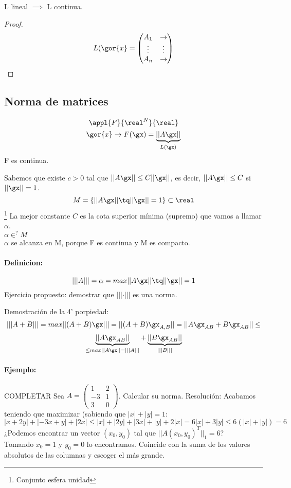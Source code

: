 \documentclass[a4paper,10pt]{apuntes}
\newcommand{\definition}[1]{\paragraph{Definicion: #1\\}}
\begin{document}
\begin{theorem}
 L lineal $\implies$ L continua.
\end{theorem}
\begin{proof}
 $$L(\gor{x} = \left(
 \begin{matrix}
  A_1 & \rightarrow \\
  \vdots & \vdots\\
  A_n & \rightarrow
 \end{matrix}\right)$$

\end{proof}
\subsection{Norma de matrices}
$$\appl{F}{\real^N}{\real}$$
$$\gor{x} \rightarrow F(\gx) = \underbrace{||A\gx||}_{L(\gx)}$$
F es continua.

Sabemos que existe $c>0$ tal que $||A\gx|| \leq C||\gx||$, es decir,  $||A\gx||\leq C$ si $||\gx||=1$.
$$M = \{||A\gx|| \tq ||\gx||=1\}\subset \real$$\footnote{Conjunto esfera unidad}
La mejor constante $C$ es la cota superior mínima (supremo) que vamos a llamar $\alpha$.\\
$\alpha \in^{?} M$\\
$\alpha$ se alcanza en M, porque F es continua y M es compacto.

\definition{}
$$|||A||| = \alpha = max{||A\gx||\tq||\gx||=1}$$
Ejercicio propuesto: demostrar que $|||\cdot|||$ es una norma.

Demostración de la 4' porpiedad:
$$|||A+B||| = max{||(A+B)\gx|||} = ||(A+B)\gx_{A,B}|| = ||A\gx_{AB} + B\gx_{AB}|| \leq$$
$$
\underbrace{||A\gx_{AB}||}_{\leq max||A\gx|| =
|||A|||} + \underbrace{||B\gx_{AB}||}_{|||B|||} $$

\paragraph{Ejemplo:}COMPLETAR
Sea $A = \begin{pmatrix}
      1&2\\-3&1\\3&0
     \end{pmatrix}$. Calcular su norma.
Resolución:
Acabamos teniendo que maximizar (sabiendo que $|x|+|y| = 1$: $|x+2y| + |-3x+y| + |2x| \leq |x|+|2y| + |3x| + |y| + 2|x| = 6|x|+3|y| \leq 6 (|x|+|y|) =6$
¿Podemos encontrar un vector $(x_0,y_0)$ tal que $||A(x_0,y_0)^T||_1 = 6$?\\
Tomando $x_0 = 1$ y $y_0 = 0$ lo encontramos.
\obs Coincide con la suma de los valores absolutos de las columnas y escoger el más grande.
\end{document}
